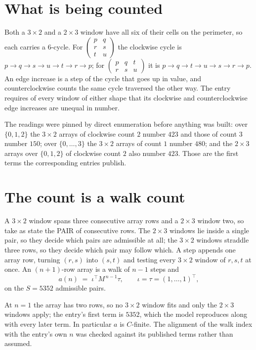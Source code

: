 \documentclass[11pt,a4paper]{article}
\theoremstyle{plain}
\theoremstyle{definition}
\begin{document}
\section{What is being counted}

Both a $3\times2$ and a $2\times3$ window have all six of their cells on the
perimeter, so each carries a $6$-cycle. For
$\begin{pmatrix}p&q\\r&s\\t&u\end{pmatrix}$ the clockwise cycle is
$p\to q\to s\to u\to t\to r\to p$; for
$\begin{pmatrix}p&q&t\\r&s&u\end{pmatrix}$ it is
$p\to q\to t\to u\to s\to r\to p$. An edge increase is a step of the cycle that goes up in
value, and counterclockwise counts the same cycle traversed the other way. The entry requires
of every window of either shape that its clockwise and counterclockwise edge increases are unequal in number.

The readings were pinned by direct enumeration before anything was built: over
$\{0,1,2\}$ the $3\times2$ arrays of clockwise count $2$ number $423$ and those of count
$3$ number $150$; over $\{0,\dots,3\}$ the $3\times2$ arrays of count $1$ number $480$;
and the $2\times3$ arrays over $\{0,1,2\}$ of clockwise count $2$ also number $423$. Those
are the first terms the corresponding entries publish.

\section{The count is a walk count}

A $3\times2$ window spans three consecutive array rows and a $2\times3$
window two, so take as state the PAIR of consecutive rows. The $2\times3$ windows lie inside a
single pair, so they decide which pairs are admissible at all; the $3\times2$ windows straddle
three rows, so they decide which pair may follow which. A step appends one array row, turning
$(r,s)$ into $(s,t)$ and testing every $3\times2$ window of $r,s,t$ at once. An $(n+1)$-row
array is a walk of $n-1$ steps and
\[
a(n)\;=\;\iota^{\!\top}M^{\,n-1}\tau,\qquad\iota=\tau=(1,\dots,1)^{\!\top},
\]
on the $S=5352$ admissible pairs.

At $n=1$ the array has two rows, so no $3\times2$ window fits and only the
$2\times3$ windows apply; the entry's first term is
$5352$, which the model reproduces along with every later term.
In particular $a$ is $C$-finite. The alignment of the walk index with the entry's own $n$ was
checked against its published terms rather than assumed.
\end{document}
